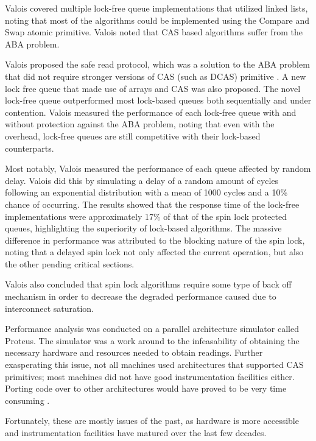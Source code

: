 \documentclass[a4paper, 12pt, titlepage]{article}
\begin{document}
\begin{onehalfspacing}
Valois covered multiple lock-free queue implementations that utilized linked lists, noting that most of the algorithms could be implemented using the Compare and Swap atomic primitive. Valois noted that CAS based algorithms suffer from the ABA problem. \cite{valois1994implementing}

Valois proposed the safe read protocol, which was a solution to the ABA problem that did not require stronger versions of CAS (such as DCAS) primitive \cite{valois1994implementing, valois1995lock}. A new lock free queue that made use of arrays and CAS was also proposed. The novel lock-free queue outperformed most lock-based queues both sequentially and under contention. Valois measured the performance of each lock-free queue with and without protection against the ABA problem, noting that even with the overhead, lock-free queues are still competitive with their lock-based counterparts.

Most notably, Valois measured the performance of each queue affected by random delay. Valois did this by simulating a delay of a random amount of cycles following an exponential distribution with a mean of 1000 cycles and a 10\% chance of occurring. The results showed that the response time of the lock-free implementations were approximately 17\% of that of the spin lock protected queues, highlighting the superiority of lock-based algorithms. The massive difference in performance was attributed to the blocking nature of the spin lock, noting that a delayed spin lock not only affected the current operation, but also the other pending critical sections.

Valois also concluded that spin lock algorithms require some type of back off mechanism in order to decrease the degraded performance caused due to interconnect saturation.

Performance analysis was conducted on a parallel architecture simulator called Proteus. The simulator was a work around to the infeasability of obtaining the necessary hardware and resources needed to obtain readings. Further exasperating this issue, not all machines used architectures that supported CAS primitives; most machines did not have good instrumentation facilities either. Porting code over to other architectures would have proved to be very time consuming \cite{valois1994implementing, valois1995lock}. 

Fortunately, these are mostly issues of the past, as hardware is more accessible and instrumentation facilities have matured over the last few decades.


\end{onehalfspacing}
\end{document}
